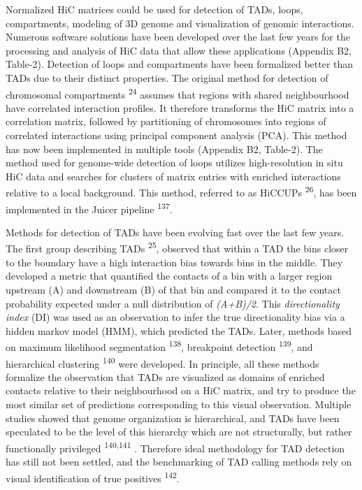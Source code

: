 \documentclass[11pt,twoside]{MPIthesis}
\theoremstyle{definition}
\theoremstyle{definition}
\theoremstyle{definition}
\theoremstyle{remark}
\begin{document}
Normalized HiC matrices could be used for detection of TADs, loops,
compartments, modeling of 3D genome and visualization of genomic
interactions. Numerous software solutions have been developed over the
last few years for the processing and analysis of HiC data that allow
these applications (Appendix B2, Table-2). Detection of loops and
compartments have been formalized better than TADs due to their distinct
properties. The original method for detection of chromosomal
compartments \textsuperscript{24} assumes that regions with shared
neighbourhood have correlated interaction profiles. It therefore
transforms the HiC matrix into a correlation matrix, followed by
partitioning of chromosomes into regions of correlated interactions
using principal component analysis (PCA). This method has now been
implemented in multiple tools (Appendix B2, Table-2). The method used
for genome-wide detection of loops utilizes high-resolution in situ HiC
data and searches for clusters of matrix entries with enriched
interactions relative to a local background. This method, referred to as
HiCCUPs \textsuperscript{26}, has been implemented in the Juicer
pipeline \textsuperscript{137}.

Methods for detection of TADs have been evolving fast over the last few
years. The first group describing TADs \textsuperscript{25}, observed
that within a TAD the bins closer to the boundary have a high
interaction bias towards bins in the middle. They developed a metric
that quantified the contacts of a bin with a larger region upstream (A)
and downstream (B) of that bin and compared it to the contact
probability expected under a null distribution of \emph{(A+B)/2}. This
\emph{directionality index} (DI) was used as an observation to infer the
true directionality bias via a hidden markov model (HMM), which
predicted the TADs. Later, methods based on maximum likelihood
segmentation \textsuperscript{138}, breakpoint detection
\textsuperscript{139}, and hierarchical clustering \textsuperscript{140}
were developed. In principle, all these methods formalize the
observation that TADs are visualized as domains of enriched contacts
relative to their neighbourhood on a HiC matrix, and try to produce the
most similar set of predictions corresponding to this visual
observation. Multiple studies showed that genome organization is
hierarchical, and TADs have been speculated to be the level of this
hierarchy which are not structurally, but rather functionally privileged
\textsuperscript{140,141} . Therefore ideal methodology for TAD
detection has still not been settled, and the benchmarking of TAD
calling methods rely on visual identification of true positives
\textsuperscript{142}.
\end{document}
